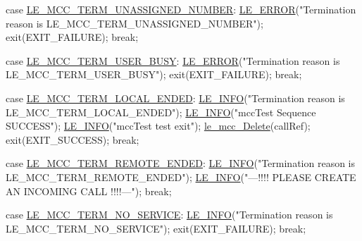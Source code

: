 \begin{DoxyCodeInclude}
{{            \textcolor{keywordflow}{case} \hyperlink{le__mcc__interface_8h_abda706f723ba619f9bc460bcc9a4960da2efa341f50cb8abef243d8ea2b9fac7d}{LE\_MCC\_TERM\_UNASSIGNED\_NUMBER}:
                \hyperlink{le__log_8h_a353590f91b3143a7ba3a416ae5a50c3d}{LE\_ERROR}(\textcolor{stringliteral}{"Termination reason is LE\_MCC\_TERM\_UNASSIGNED\_NUMBER"});
                exit(EXIT\_FAILURE);
                \textcolor{keywordflow}{break};

            \textcolor{keywordflow}{case} \hyperlink{le__mcc__interface_8h_abda706f723ba619f9bc460bcc9a4960dad7664d1f5a0c6517861637d0a083020c}{LE\_MCC\_TERM\_USER\_BUSY}:
                \hyperlink{le__log_8h_a353590f91b3143a7ba3a416ae5a50c3d}{LE\_ERROR}(\textcolor{stringliteral}{"Termination reason is LE\_MCC\_TERM\_USER\_BUSY"});
                exit(EXIT\_FAILURE);
                \textcolor{keywordflow}{break};

            \textcolor{keywordflow}{case} \hyperlink{le__mcc__interface_8h_abda706f723ba619f9bc460bcc9a4960daf4262288191582892e6f84e51e3082c1}{LE\_MCC\_TERM\_LOCAL\_ENDED}:
                \hyperlink{le__log_8h_a23e6d206faa64f612045d688cdde5808}{LE\_INFO}(\textcolor{stringliteral}{"Termination reason is LE\_MCC\_TERM\_LOCAL\_ENDED"});
                \hyperlink{le__log_8h_a23e6d206faa64f612045d688cdde5808}{LE\_INFO}(\textcolor{stringliteral}{"mccTest Sequence SUCCESS"});
                \hyperlink{le__log_8h_a23e6d206faa64f612045d688cdde5808}{LE\_INFO}(\textcolor{stringliteral}{"mccTest test exit"});
                \hyperlink{le__mcc__interface_8h_a1a016e6443df2d3ee99113649f4f34ae}{le\_mcc\_Delete}(callRef);
                exit(EXIT\_SUCCESS);
                \textcolor{keywordflow}{break};

            \textcolor{keywordflow}{case} \hyperlink{le__mcc__interface_8h_abda706f723ba619f9bc460bcc9a4960dad33c3e71bdfd7513392f28bf2a7e9c9b}{LE\_MCC\_TERM\_REMOTE\_ENDED}:
                \hyperlink{le__log_8h_a23e6d206faa64f612045d688cdde5808}{LE\_INFO}(\textcolor{stringliteral}{"Termination reason is LE\_MCC\_TERM\_REMOTE\_ENDED"});
                \hyperlink{le__log_8h_a23e6d206faa64f612045d688cdde5808}{LE\_INFO}(\textcolor{stringliteral}{"---!!!! PLEASE CREATE AN INCOMING CALL !!!!---"});
                \textcolor{keywordflow}{break};

            \textcolor{keywordflow}{case} \hyperlink{le__mcc__interface_8h_abda706f723ba619f9bc460bcc9a4960da4e0eb63003598ed7103a45ea5521598d}{LE\_MCC\_TERM\_NO\_SERVICE}:
                \hyperlink{le__log_8h_a23e6d206faa64f612045d688cdde5808}{LE\_INFO}(\textcolor{stringliteral}{"Termination reason is LE\_MCC\_TERM\_NO\_SERVICE"});
                exit(EXIT\_FAILURE);
                \textcolor{keywordflow}{break};

}}
\end{DoxyCodeInclude}
